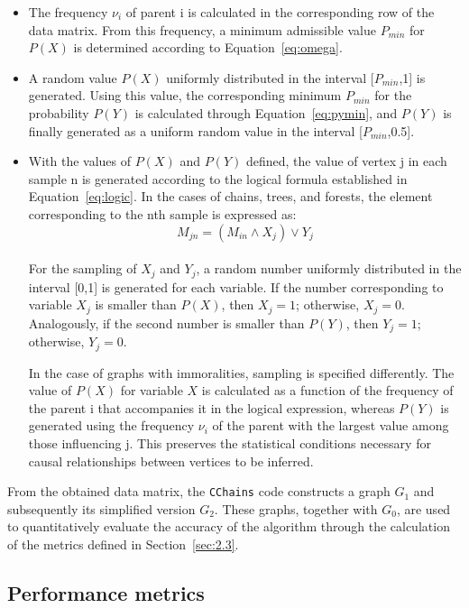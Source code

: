 \documentclass[12pt,a4paper]{report}
\begin{document}
\begin{itemize}
\item The frequency $\nu_i$ of parent i is calculated in the corresponding row of the data matrix. From this frequency, a minimum admissible value $P_{min}$ for $P(X)$ is determined according to Equation~\ref{eq:omega}.
\item A random value $P(X)$ uniformly distributed in the interval [$P_{min}$,1] is generated. Using this value, the corresponding minimum $P_{min}$ for the probability $P(Y)$ is calculated through Equation~\ref{eq:pymin}, and $P(Y)$ is finally generated as a uniform random value in the interval [$P_{min}$,0.5].
\item With the values of $P(X)$ and $P(Y)$ defined, the value of vertex j in each sample n is generated according to the logical formula established in Equation~\ref{eq:logic}. In the cases of chains, trees, and forests, the element corresponding to the nth sample is expressed as:
	\begin{equation*}
		M_{jn} = (M_{in} \land X_j) \lor Y_j
	\end{equation*}
\\
For the sampling of $X_j$ and $Y_j$, a random number uniformly distributed in the interval [0,1] is generated for each variable. If the number corresponding to variable $X_j$ is smaller than $P(X)$, then $X_j = 1$; otherwise, $X_j = 0$. Analogously, if the second number is smaller than $P(Y)$, then $Y_j = 1$; otherwise, $Y_j = 0$. 

In the case of graphs with immoralities, sampling is specified differently. The value of $P(X)$ for variable $X$ is calculated as a function of the frequency of the parent i that accompanies it in the logical expression, whereas $P(Y)$ is generated using the frequency $\nu_i$ of the parent with the largest value among those influencing j. This preserves the statistical conditions necessary for causal relationships between vertices to be inferred.
\end{itemize} 
     

From the obtained data matrix, the \texttt{CChains} code constructs a graph $G_1$ and subsequently its simplified version $G_2$. These graphs, together with $G_0$, are used to quantitatively evaluate the accuracy of the algorithm through the calculation of the metrics defined in Section~\ref{sec:2.3}.



\subsection{Performance metrics}
\end{document}
